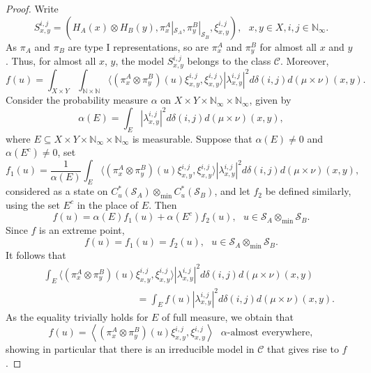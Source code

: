 \documentclass[11pt]{amsart}
\theoremstyle{definition}
\newcommand{\cl}[1]{\mathcal{#1}}
\newcommand{\bb}[1]{\mathbb{#1}}
\begin{document}
\begin{proof}
  Write 
  $$S_{x,y}^{i,j} = 
  (H_A(x)\otimes H_B(y), \pi_x^A|_{\cl S_{A}}, \pi_y^B|_{\cl S_{B}}, \xi_{x,y}^{i,j}), \ \ \ x,y\in X, i,j\in \bb{N}_{\infty}.$$
  As $\pi_A$ and $\pi_B$ are type I representations, so are $\pi_x^A$ and $\pi_y^B$ for almost all $x$ and $y$ \cite[Proposition 8.4.8]{dixmier}.
  Thus, for almost all $x$, $y$, the model 
  $S_{x,y}^{i,j}$ belongs to the class $\cl C$. 
  Moreover,
  $$f(u) = \int_{X\times Y}\int_{\mathbb N\times\mathbb N}\langle(\pi_x^A\otimes\pi_y^B)(u)\xi_{x,y}^{i,j},\xi_{x,y}^{i,j}\rangle|\lambda_{x,y}^{i,j}|^2 d\delta(i,j)d(\mu\times\nu)(x,y). $$
  Consider the probability measure $\alpha$ on 
  $X\times Y\times\mathbb N_\infty\times\mathbb N_\infty$, given by $$\alpha(E)=\int_E|\lambda_{x,y}^{i,j}|^2d\delta(i,j)d(\mu\times\nu)(x,y),$$ 
  where $E \subseteq X\times Y\times\mathbb N_\infty\times\mathbb N_\infty$ is measurable.
  Suppose that $\alpha(E) \ne 0$ and $\alpha(E^c)\ne 0$, set
$$f_1(u)= \frac{1}{\alpha(E)}\int_E\langle(\pi_x^A\otimes\pi_y^B)(u)\xi_{x,y}^{i,j},\xi_{x,y}^{i,j}\rangle|\lambda_{x,y}^{i,j}|^2
 d\delta(i,j)d(\mu\times\nu)(x,y),$$ 
considered as a state on $C^*_u(\cl S_A)\otimes_{\min} C^*_u(\cl S_B)$, 
and let $f_2$ be defined similarly, using the set $E^c$ in the place of $E$.
Then  
$$f(u) = \alpha(E)f_1(u)+\alpha({E^c}) f_2(u), \ \ \ 
u\in \cl S_A\otimes_{\min} \cl S_B.$$ 
Since $f$ is an extreme point,  
$$f(u) = f_1(u) = f_2(u), \ \ \ u\in \cl S_A\otimes_{\min} \cl S_B.$$
It follows that 
\begin{eqnarray*}
  && 
  \int_{E}\langle(\pi_x^A\otimes\pi_y^B)(u)\xi_{x,y}^{i,j},\xi_{x,y}^{i,j}\rangle|\lambda_{x,y}^{i,j}|^2d\delta(i,j)
  d(\mu\times\nu)(x,y)\\
  &&
  \hspace{4cm} =\int_Ef(u)|\lambda_{x,y}^{i,j}|^2d\delta(i,j)
  d(\mu\times\nu)(x,y).
  \end{eqnarray*}
  As the equality trivially holds for $E$ of full measure, we obtain that
\begin{equation}\label{eq_f(u)=}
f(u) = \left\langle(\pi_x^A\otimes\pi_y^B)(u)\xi_{x,y}^{i,j},\xi_{x,y}^{i,j}\right\rangle 
  \ \ \ \alpha\mbox{-almost everywhere},
\end{equation}  
  showing in particular that there is an irreducible model in $\cl C$ 
  that gives rise to $f$. 


\end{proof}
\end{document}
